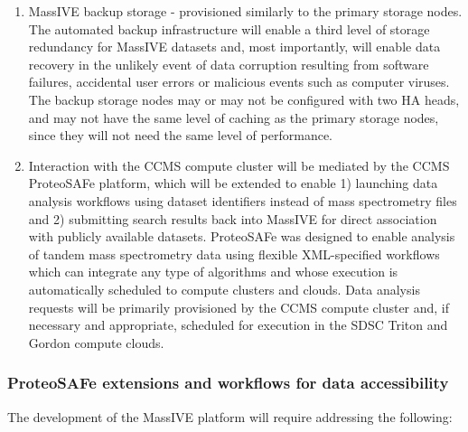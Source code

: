 \documentclass[arial,11pt]{article}
\begin{document}
\begin{enumerate}
\item MassIVE backup storage - provisioned similarly to the primary storage nodes. The automated backup infrastructure will enable a third level of storage redundancy for MassIVE datasets and, most importantly, will enable data recovery in the unlikely event of data corruption resulting from software failures, accidental user errors or malicious events such as computer viruses. The backup storage nodes may or may not be configured with two HA heads, and may not have the same level of caching as the primary storage nodes, since they will not need the same level of performance.

\item Interaction with the CCMS compute cluster will be mediated by the CCMS ProteoSAFe platform, which will be extended to enable 1) launching data analysis workflows using dataset identifiers instead of mass spectrometry files and 2) submitting search results back into MassIVE for direct association with publicly available datasets. ProteoSAFe was designed to enable analysis of tandem mass spectrometry data using flexible XML-specified workflows which can integrate any type of algorithms and whose execution is automatically scheduled to compute clusters and clouds. Data analysis requests will be primarily provisioned by the CCMS compute cluster and, if necessary and appropriate, scheduled for execution in the SDSC Triton and Gordon compute clouds.
\end{enumerate}


\subsubsection{ProteoSAFe extensions and workflows for data accessibility}

The development of the MassIVE platform will require addressing the following:
\end{document}
